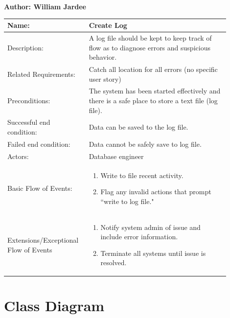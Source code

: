 \documentclass[11pt]{article}
\begin{document}
\begin{table}[!ht]
\begin{center}
\textbf{Author: William Jardee}
\vspace*{1em}

\begin{tabular}{p{0.30\linewidth}p{0.60\linewidth}}
	Name: & Create Log\\\hline
	Description: & A log file should be kept to keep track of flow as to diagnose errors and suspicious behavior.\\\hline
	Related Requirements:& Catch all location for all errors (no specific user story)\\\hline
	Preconditions:& The system has been started effectively and there is a safe place to store a text file (log file).\\\hline
	Successful end condition:& Data can be saved to the log file.\\\hline
	Failed end condition:& Data cannot be safely save to log file.\\\hline
	Actors:& Database engineer \\\hline
	Basic Flow of Events: & \begin{enumerate}
	\item Write to file recent activity.
	\item Flag any invalid actions that prompt ``write to log file."
	\end{enumerate}\\\hline
	Extensions/Exceptional Flow of Events & \begin{enumerate}
	\item Notify system admin of issue and include error information.
	\item Terminate all systems until issue is resolved.
	\end{enumerate}
\end{tabular}
\label{des:create_log}
\end{center}
\end{table}

\clearpage

\section*{Class Diagram}
\end{document}
